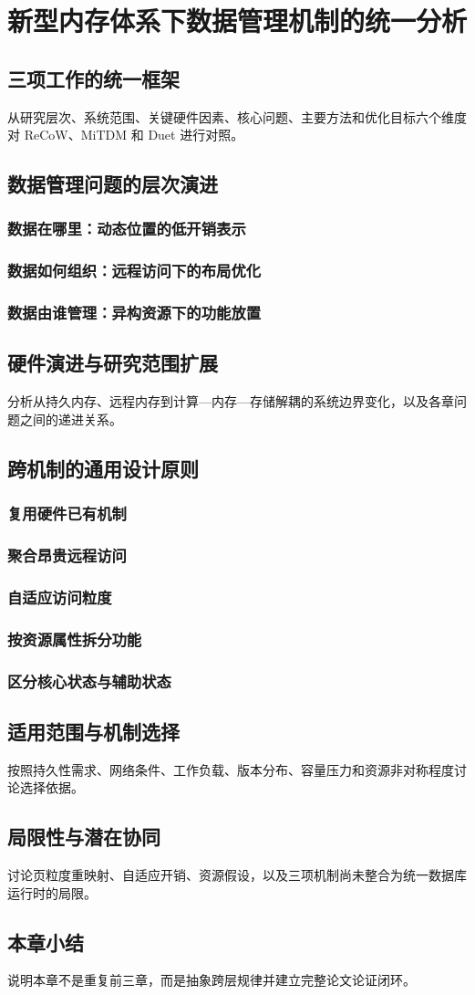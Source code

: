 \chapter{新型内存体系下数据管理机制的统一分析}

\section{三项工作的统一框架}
从研究层次、系统范围、关键硬件因素、核心问题、主要方法和优化目标六个维度对 ReCoW、MiTDM 和 Duet 进行对照。
\section{数据管理问题的层次演进}
\subsection{数据在哪里：动态位置的低开销表示}
\subsection{数据如何组织：远程访问下的布局优化}
\subsection{数据由谁管理：异构资源下的功能放置}
\section{硬件演进与研究范围扩展}
分析从持久内存、远程内存到计算—内存—存储解耦的系统边界变化，以及各章问题之间的递进关系。
\section{跨机制的通用设计原则}
\subsection{复用硬件已有机制}
\subsection{聚合昂贵远程访问}
\subsection{自适应访问粒度}
\subsection{按资源属性拆分功能}
\subsection{区分核心状态与辅助状态}
\section{适用范围与机制选择}
按照持久性需求、网络条件、工作负载、版本分布、容量压力和资源非对称程度讨论选择依据。
\section{局限性与潜在协同}
讨论页粒度重映射、自适应开销、资源假设，以及三项机制尚未整合为统一数据库运行时的局限。
\section{本章小结}
说明本章不是重复前三章，而是抽象跨层规律并建立完整论文论证闭环。
